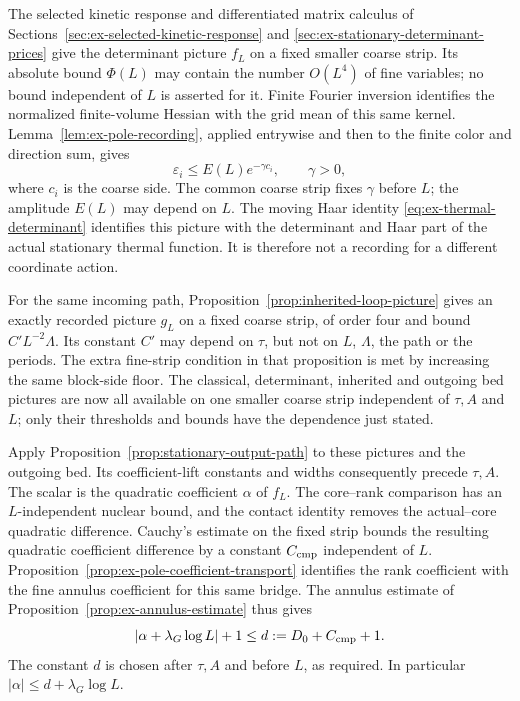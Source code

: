 The selected kinetic response and differentiated matrix calculus of
Sections~\ref{sec:ex-selected-kinetic-response} and
\ref{sec:ex-stationary-determinant-prices} give the determinant picture
$f_L$ on a fixed smaller coarse strip. Its absolute bound $\Phi(L)$ may
contain the number $O(L^4)$ of fine variables; no bound independent of $L$
is asserted for it. Finite Fourier inversion identifies the normalized
finite-volume Hessian with the grid mean of this same kernel.
Lemma~\ref{lem:ex-pole-recording}, applied entrywise and then to the finite
color and direction sum, gives
\[
 \varepsilon_i\leq E(L)e^{-\gamma c_i},\qquad \gamma>0,
\]
where $c_i$ is the coarse side. The common coarse strip fixes $\gamma$
before $L$; the amplitude $E(L)$ may depend on $L$. The moving Haar
identity \eqref{eq:ex-thermal-determinant} identifies this picture with
the determinant and Haar part of the actual stationary thermal function.
It is therefore not a recording for a different coordinate action.

For the same incoming path, Proposition~\ref{prop:inherited-loop-picture}
gives an exactly recorded picture $g_L$ on a fixed coarse strip, of order
four and bound $C' L^{-2}\Lambda$. Its constant $C'$ may depend on $\tau$,
but not on $L$, $\Lambda$, the path or the periods. The extra fine-strip
condition in that proposition is met by increasing the same block-side
floor. The classical, determinant, inherited and outgoing bed pictures
are now all available on one smaller coarse strip independent of $\tau,A$
and $L$; only their thresholds and bounds have the dependence just stated.

Apply Proposition~\ref{prop:stationary-output-path} to these pictures and
the outgoing bed. Its coefficient-lift constants and widths consequently
precede $\tau,A$. The scalar is the quadratic coefficient $\alpha$ of
$f_L$. The core--rank comparison has an $L$-independent nuclear bound,
and the contact identity removes the actual--core quadratic difference.
Cauchy's estimate on the fixed strip bounds the resulting quadratic
coefficient difference by a constant $C_{\rm cmp}$ independent of $L$.
Proposition~\ref{prop:ex-pole-coefficient-transport} identifies the rank
coefficient with the fine annulus coefficient for this same bridge.
The annulus estimate of Proposition~\ref{prop:ex-annulus-estimate} thus gives
\[
 |\alpha+\lambda_G\log L|+1\leq
                d:=D_0+C_{\rm cmp}+1.
\]
The constant $d$ is chosen after $\tau,A$ and before $L$, as required.
In particular $|\alpha|\leq d+\lambda_G\log L$.


